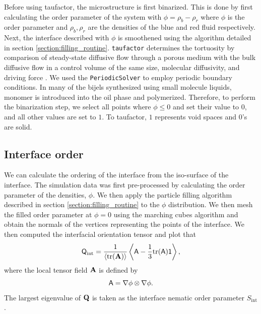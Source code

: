 
Before using taufactor, the microstructure is first binarized. This is done by first calculating the order parameter of 
the system with $\phi = \rho_b - \rho_r$ where $\phi$ is the order parameter and $\rho_b, \rho_r$ are the densities of 
the blue and red fluid respectively. Next, the interface described with $\phi$ is smoothened using the algorithm detailed 
in section \ref{section:filling_routine}. \texttt{taufactor} determines the tortuosity by comparison
of steady-state diffusive flow through a porous medium with the bulk
diffusive flow in a control volume of the same size, molecular
diffusivity, and driving force \cite{cooper_taufactor_2016, kench_taufactor_2023}. We used
the \texttt{PeriodicSolver} to employ periodic boundary conditions. In many of the bijels synthesized using small molecule liquids, monomer is 
introduced into the oil phase and polymerized. Therefore, to perform the binarization step, we select all points where 
$\phi \leq 0$ and set their value to $0$, and all other values are set to $1$. To taufactor, $1$ represents void spaces 
and 0's are solid. \cite{cooper_taufactor_2016, kench_taufactor_2023}

\subsection{Interface order}
\label{section:interface_order}

We can calculate the ordering of the interface from the iso-surface of the interface. The simulation data was first pre-processed by calculating the 
order parameter of the densities, $\phi$. We then apply the particle filling algorithm described in section \ref{section:filling_routine} 
to the $\phi$ distribution. We then mesh the filled order parameter at $\phi = 0$ using the marching cubes algorithm and obtain the normals of the
vertices representing the points of the interface. We then computed the interfacial orientation tensor and plot that 
%
\begin{equation}
\tens{Q}_{\text{int}} = \frac{1}{\langle \mathrm{tr}(\tens{A}) \rangle} 
\left\langle \tens{A} - \frac{1}{3} \mathrm{tr}(\tens{A}) \mathsf{1} \right\rangle ,
\end{equation}
%
where the local tensor field $\tens{A}$ is defined by
%
\begin{equation}
\tens{A} = \nabla\phi\otimes\nabla\phi .
\end{equation}
%
The largest eigenvalue of $\tens{Q}$ is taken as the
interface nematic order parameter $S_{\text{int}}$.

